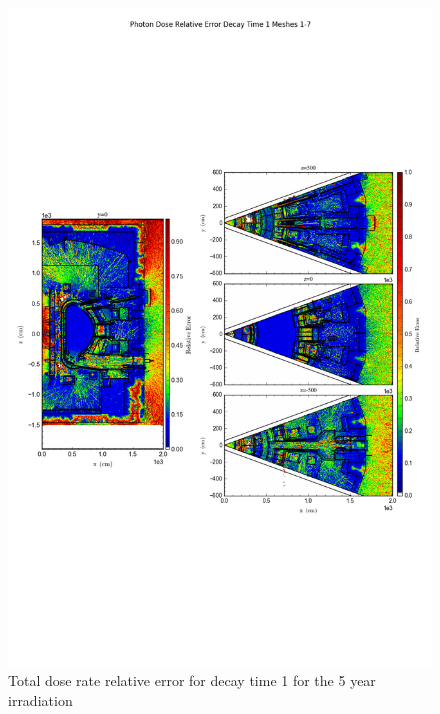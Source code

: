 \documentclass[12pt]{article}
\begin{document}
\begin{figure}[ht!]
\centering
\includegraphics[trim={0cm 8cm, 0cm 8cm},clip,scale=0.75]{../plots/final_model/5year/Photon_Dose_Relative_Error_Decay_Time_1_Meshes_1-7.png}
\caption{Total dose rate relative error for decay time 1 for the 5 year irradiation}
\label{fig:photons_5y_dc1_nob4c_relerr}
\end{figure}
\clearpage
\end{document}
